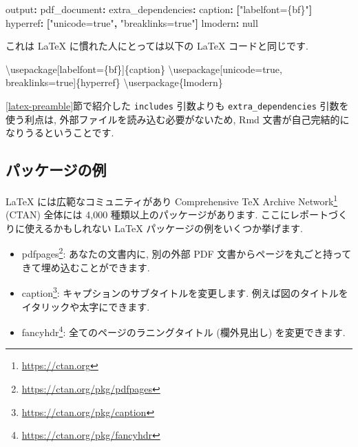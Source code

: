 \documentclass[
  11pt,
  lualatex,ja=standard,jafont=noto]{bxjsreport}
\newenvironment{Shaded}{\begin{snugshade}}{\end{snugshade}}
\newcommand{\AttributeTok}[1]{\textcolor[rgb]{0.77,0.63,0.00}{#1}}
\newcommand{\BuiltInTok}[1]{#1}
\newcommand{\CharTok}[1]{\textcolor[rgb]{0.31,0.60,0.02}{#1}}
\newcommand{\ExtensionTok}[1]{#1}
\newcommand{\FunctionTok}[1]{\textcolor[rgb]{0.00,0.00,0.00}{#1}}
\newcommand{\KeywordTok}[1]{\textcolor[rgb]{0.13,0.29,0.53}{\textbf{#1}}}
\newcommand{\NormalTok}[1]{#1}
\newcommand{\StringTok}[1]{\textcolor[rgb]{0.31,0.60,0.02}{#1}}
\providecommand{\tightlist}{%
  \setlength{\itemsep}{0pt}\setlength{\parskip}{0pt}}
\renewcommand{\href}[2]{#2\footnote{\url{#1}}}
\begin{document}
\begin{Shaded}
\begin{Highlighting}[]
\FunctionTok{output}\KeywordTok{:}\AttributeTok{ }
\AttributeTok{  }\FunctionTok{pdf\_document}\KeywordTok{:}
\AttributeTok{    }\FunctionTok{extra\_dependencies}\KeywordTok{:}
\AttributeTok{      }\FunctionTok{caption}\KeywordTok{:}\AttributeTok{ }\KeywordTok{[}\StringTok{"labelfont=\{bf\}"}\KeywordTok{]}
\AttributeTok{      }\FunctionTok{hyperref}\KeywordTok{:}\AttributeTok{ }\KeywordTok{[}\StringTok{"unicode=true"}\KeywordTok{,}\AttributeTok{ }\StringTok{"breaklinks=true"}\KeywordTok{]}
\AttributeTok{      }\FunctionTok{lmodern}\KeywordTok{:}\AttributeTok{ }\CharTok{null}
\end{Highlighting}
\end{Shaded}

これは LaTeX に慣れた人にとっては以下の LaTeX コードと同じです.

\begin{Shaded}
\begin{Highlighting}[]
\BuiltInTok{\textbackslash{}usepackage}\NormalTok{[labelfont=\{bf\}]\{}\ExtensionTok{caption}\NormalTok{\} }
\BuiltInTok{\textbackslash{}usepackage}\NormalTok{[unicode=true, breaklinks=true]\{}\ExtensionTok{hyperref}\NormalTok{\}}
\FunctionTok{\textbackslash{}userpackage}\NormalTok{\{lmodern\}}
\end{Highlighting}
\end{Shaded}

\ref{latex-preamble}節で紹介した \texttt{includes} 引数よりも \texttt{extra\_dependencies} 引数を使う利点は, 外部ファイルを読み込む必要がないため, Rmd 文書が自己完結的になりうるということです.

\hypertarget{example-packages}{%
\subsection{パッケージの例}\label{example-packages}}

LaTeX には広範なコミュニティがあり \href{https://ctan.org}{Comprehensive TeX Archive Network} (CTAN) 全体には 4,000 種類以上のパッケージがあります. ここにレポートづくりに使えるかもしれない LaTeX パッケージの例をいくつか挙げます.

\begin{itemize}
\tightlist
\item
  \href{https://ctan.org/pkg/pdfpages}{pdfpages}: あなたの文書内に, 別の外部 PDF 文書からページを丸ごと持ってきて埋め込むことができます.
\item
  \href{https://ctan.org/pkg/caption}{caption}: キャプションのサブタイトルを変更します. 例えば図のタイトルをイタリックや太字にできます.
\item
  \href{https://ctan.org/pkg/fancyhdr}{fancyhdr}: 全てのページのラニングタイトル (欄外見出し) を変更できます.
\end{itemize}
\end{document}
